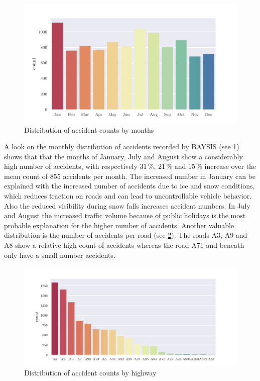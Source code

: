 \begin{figure}[ht]
	\centering
	\includegraphics[scale=0.9]{CorrAnalysis/data/BAYSIS/01_dataset/plots/baysis_dataset_hist_month}
	\caption{Distribution of accident counts by months}
	\label{img:baysis_dataset_dist_month}
\end{figure}
A look on the monthly distribution of accidents recorded by BAYSIS (see \cref{img:baysis_dataset_dist_month}) shows that that the months of January, July and August show a considerably high number of accidents, with respectively 31\,\%, 21\,\% and 15\,\% increase over the mean count of 855 accidents per month. The increased number in January can be explained with the increased number of accidents due to ice and snow conditions, which reduces traction on roads and can lead to uncontrollable vehicle behavior. Also the reduced visibility during snow falls increases accident numbers. In July and August the increased traffic volume because of public holidays is the most probable explanation for the higher number of accidents. Another valuable distribution is the number of accidents per road (see \cref{img:baysis_dataset_dist_highway}). The roads A3, A9 and A8 show a relative high count of accidents whereas the road A71 and beneath only have a small number accidents.
\begin{figure}[ht]
	\centering
	\includegraphics[scale=0.75]{CorrAnalysis/data/BAYSIS/01_dataset/plots/baysis_dataset_hist_highway}
	\caption{Distribution of accident counts by highway}
	\label{img:baysis_dataset_dist_highway}
	\vspace{-8mm}
\end{figure}

